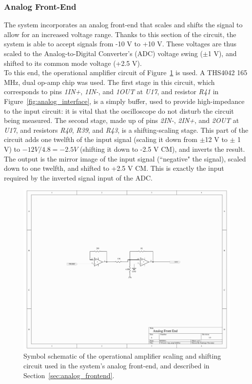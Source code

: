 \documentclass[titlepage]{scrartcl}
\begin{document}
	\clearpage
	
	\subsubsection{Analog Front-End \label{sec:analog_frontend}}
	The system incorporates an analog front-end that scales and shifts the signal to allow for an increased voltage range. Thanks to this section of the circuit, the system is able to accept signals from -10 V to +10 V. These voltages are thus scaled to the Analog-to-Digital Converter's (ADC) voltage swing ($\pm$1 V), and shifted to its common mode voltage (+2.5 V).\\

	To this end, the operational amplifier circuit of Figure~\ref{fig:op_amp} is used. A THS4042 165 MHz, dual op-amp chip was used. The first stage in this circuit, which corresponds to pins \textit{1IN+}, \textit{1IN-}, and \textit{1OUT} at \textit{U17}, and resistor \textit{R41} in Figure~\ref{fig:analog_interface}, is a simply buffer, used to provide high-impedance to the input circuit: it is vital that the oscilloscope do not disturb the circuit being measured. The second stage, made up of pins \textit{2IN-}, \textit{2IN+}, and \textit{2OUT} at \textit{U17}, and resistors \textit{R40}, \textit{R39}, and \textit{R43}, is a shifting-scaling stage. This part of the circuit adds one twelfth of the input signal (scaling it down from $\pm$12 V to $\pm$ 1 V) to $-12 V / 4.8 = -2.5 V$ (shifting it down to -2.5 V CM), and inverts the result. The output is the mirror image of the input signal (``negative" the signal), scaled down to one twelfth, and shifted to +2.5 V CM. This is exactly the input required by the inverted signal input of the ADC.\\

	\begin{figure}[h!]
	\vspace{-2cm}
	\centerline{\includegraphics[width=26cm, angle=90, origin=c]{img/op_amp.pdf}}
                	\caption{Symbol schematic of the operational amplifier scaling and shifting circuit used in the system's analog front-end, and described in Section~\ref{sec:analog_frontend}.}
               	\label{fig:op_amp}
	\end{figure}
\end{document}
